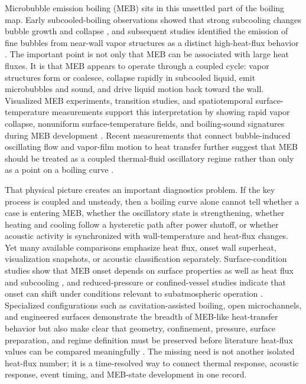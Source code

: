 \documentclass[final,1p,times]{elsarticle}
\begin{document}
Microbubble emission boiling (MEB) sits in this unsettled part of the boiling map. Early subcooled-boiling observations showed that strong subcooling changes bubble growth and collapse \citep{gunther_1950_subcooled_bubble_photography,ivey_1966_subcooled_chf}, and subsequent studies identified the emission of fine bubbles from near-wall vapor structures as a distinct high-heat-flux behavior \citep{inada_1981_subcooled_pool_boiling,zeigarnik_2012_microbubble_emission_nature}. The important point is not only that MEB can be associated with large heat fluxes. It is that MEB appears to operate through a coupled cycle: vapor structures form or coalesce, collapse rapidly in subcooled liquid, emit microbubbles and sound, and drive liquid motion back toward the wall. Visualized MEB experiments, transition studies, and spatiotemporal surface-temperature measurements support this interpretation by showing rapid vapor collapse, nonuniform surface-temperature fields, and boiling-sound signatures during MEB development \citep{zhu_2014_visualized_meb,tang_2016_transition_to_meb,tang_2019_transient_nucleate_to_meb,horiuchi_2021_spatial_temporal_thermal_fluid}. Recent measurements that connect bubble-induced oscillating flow and vapor-film motion to heat transfer further suggest that MEB should be treated as a coupled thermal-fluid oscillatory regime rather than only as a point on a boiling curve \citep{li_2022_oscillating_vapor_film,tang_2023_bubble_induced_oscillating_flow}.

That physical picture creates an important diagnostics problem. If the key process is coupled and unsteady, then a boiling curve alone cannot tell whether a case is entering MEB, whether the oscillatory state is strengthening, whether heating and cooling follow a hysteretic path after power shutoff, or whether acoustic activity is synchronized with wall-temperature and heat-flux changes. Yet many available comparisons emphasize heat flux, onset wall superheat, visualization snapshots, or acoustic classification separately. Surface-condition studies show that MEB onset depends on surface properties as well as heat flux and subcooling \citep{unno_2022_surface_properties_meb_onset}, and reduced-pressure or confined-vessel studies indicate that onset can shift under conditions relevant to subatmospheric operation \citep{unno_2025_reduced_pressure_confined_meb}. Specialized configurations such as cavitation-assisted boiling, open microchannels, and engineered surfaces demonstrate the breadth of MEB-like heat-transfer behavior but also make clear that geometry, confinement, pressure, surface preparation, and regime definition must be preserved before literature heat-flux values can be compared meaningfully \citep{inada_2016_cavitation_bubble_blow_pit,zhao_2025_open_microchannel_meb,elele_2018_single_bubble_boiling,liu_2020_pin_cluster_nucleation}. The missing need is not another isolated heat-flux number; it is a time-resolved way to connect thermal response, acoustic response, event timing, and MEB-state development in one record.
\end{document}
